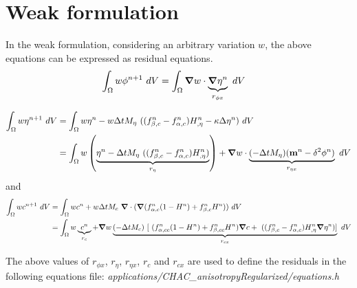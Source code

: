 \documentclass[10pt]{article}
\newcommand{\gv}[1]{\ensuremath{\mbox{\boldmath$ #1 $}}}
\newcommand{\grad}[1]{\gv{\nabla} #1}
\begin{document}
\section{Weak formulation}
In the weak formulation, considering an arbitrary variation $w$, the above equations can be expressed as residual equations.
\begin{align}
  \int_{\Omega}   w  \phi^{n+1}  ~dV &=\int_{\Omega}  \grad w \cdot \underbrace{ \grad \eta^n }_{r_{\phi x}} ~dV 
\end{align}

\begin{align}
  \int_{\Omega}   w  \eta^{n+1}  ~dV &= \int_{\Omega}   w \eta^{n} -   w    \Delta t M_{\eta}~ ((f_{\beta,c}^n-f_{\alpha,c}^n)H_{,\eta}^n - \kappa \Delta \eta^n)  ~dV\\
  &=\int_{\Omega}  w  \left( \underbrace{\eta^{n} - \Delta t M_{\eta}~ ((f_{\beta,c}^n-f_{\alpha,c}^n)H_{,\eta}^n)}_{r_{\eta}} \right)+ \grad w \cdot \underbrace{(- \Delta t M_{\eta})  ( \mathbf{m}^n - \delta^2 \phi^n)}_{r_{\eta x}} ~dV 
\end{align}
and 
\begin{align}
  \int_{\Omega}   w  c^{n+1}  ~dV &= \int_{\Omega}   w c^{n} + w    \Delta t M_{c}~ \grad \cdot (\grad (f_{\alpha,c}^n(1-H^{n})+f_{\beta,c}^n H^{n}))  ~dV\\
    &= \int_{\Omega}   w \underbrace{c^{n}}_{r_c} +  \grad w   \underbrace{(-\Delta t M_{c})~ [~(f_{\alpha,cc}^n(1-H^{n})+f_{\beta,cc}^n H^{n}) \grad c + ~((f_{\beta,c}^n-f_{\alpha,c}^n)H^{n}_{,\eta} \grad \eta^n) ] }_{r_{cx}} ~dV
\end{align}

\vskip 0.25in
The above values of $r_{\phi x}$, $r_{\eta}$, $r_{\eta x}$, $r_{c}$ and $r_{cx}$ are used to define the residuals in the following equations file: \textit{applications/CHAC\_anisotropyRegularized/equations.h}
\end{document}
